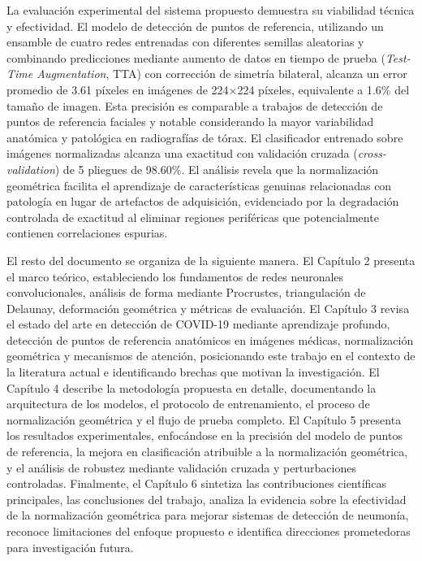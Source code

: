 La evaluaci\'on experimental del sistema propuesto demuestra su viabilidad t\'ecnica y efectividad. El modelo de detecci\'on de puntos de referencia, utilizando un ensamble de cuatro redes entrenadas con diferentes semillas aleatorias y combinando predicciones mediante aumento de datos en tiempo de prueba (\textit{Test-Time Augmentation}, TTA) con correcci\'on de simetr\'ia bilateral, alcanza un error promedio de 3.61 p\'ixeles en im\'agenes de 224$\times$224 p\'ixeles, equivalente a 1.6\% del tama\~no de imagen. Esta precisi\'on es comparable a trabajos de detecci\'on de puntos de referencia faciales y notable considerando la mayor variabilidad anat\'omica y patol\'ogica en radiograf\'ias de t\'orax. El clasificador entrenado sobre im\'agenes normalizadas alcanza una exactitud con validaci\'on cruzada (\textit{cross-validation}) de 5 pliegues de 98.60\%. El an\'alisis revela que la normalizaci\'on geom\'etrica facilita el aprendizaje de caracter\'isticas genuinas relacionadas con patolog\'ia en lugar de artefactos de adquisici\'on, evidenciado por la degradaci\'on controlada de exactitud al eliminar regiones perif\'ericas que potencialmente contienen correlaciones espurias.

El resto del documento se organiza de la siguiente manera. El Cap\'itulo 2 presenta el marco te\'orico, estableciendo los fundamentos de redes neuronales convolucionales, an\'alisis de forma mediante Procrustes, triangulaci\'on de Delaunay, deformaci\'on geom\'etrica y m\'etricas de evaluaci\'on. El Cap\'itulo 3 revisa el estado del arte en detecci\'on de COVID-19 mediante aprendizaje profundo, detección de puntos de referencia anat\'omicos en im\'agenes m\'edicas, normalizaci\'on geom\'etrica y mecanismos de atenci\'on, posicionando este trabajo en el contexto de la literatura actual e identificando brechas que motivan la investigaci\'on. El Cap\'itulo 4 describe la metodolog\'ia propuesta en detalle, documentando la arquitectura de los modelos, el protocolo de entrenamiento, el proceso de normalizaci\'on geom\'etrica y el flujo de prueba completo. El Cap\'itulo 5 presenta los resultados experimentales, enfoc\'andose en la precisi\'on del modelo de puntos de referencia, la mejora en clasificaci\'on atribuible a la normalizaci\'on geom\'etrica, y el an\'alisis de robustez mediante validaci\'on cruzada y perturbaciones controladas. Finalmente, el Cap\'itulo 6 sintetiza las contribuciones cient\'ificas principales, las conclusiones del trabajo, analiza la evidencia sobre la efectividad de la normalizaci\'on geom\'etrica para mejorar sistemas de detecci\'on de neumon\'ia, reconoce limitaciones del enfoque propuesto e identifica direcciones prometedoras para investigaci\'on futura.
